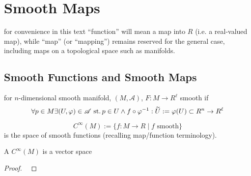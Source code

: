 \chapter{Smooth Maps}\label{chap:02}

\begin{defn}
  for convenience in this text ``function'' will mean a map into $R$
  (i.e. a real-valued map), while ``map'' (or ``mapping'') remains
  reserved for the general case,
  including maps on a topological space such as manifolds.
\end{defn}

\section{Smooth Functions and Smooth Maps}

\begin{defn}
  for $n$-dimensional smooth manifold, $(M,\mathscr A)$,
  $F:M\rightarrow R^\ell$ smooth if
  \[
  \forall p\in M\exists (U,\varphi)\in\mathscr A
  \operatorname{\,st.} p\in U\land f\circ\varphi^{-1}:
  \widetilde{U}:=\varphi(U)\subset R^n\rightarrow R^\ell
  \]
\end{defn}


\begin{defn}
  \[
  C^\infty(M):= \{f:M\rightarrow R\mid f\text{ smooth}\}
  \]
  is the space of smooth functions
  (recalling map/function terminology).
\end{defn}

\begin{rem}{A}\label{rem:02:sm-fn-vec-spc}
  $C^\infty(M)$ is a vector space
\end{rem}
\begin{proof}\
\end{proof}

